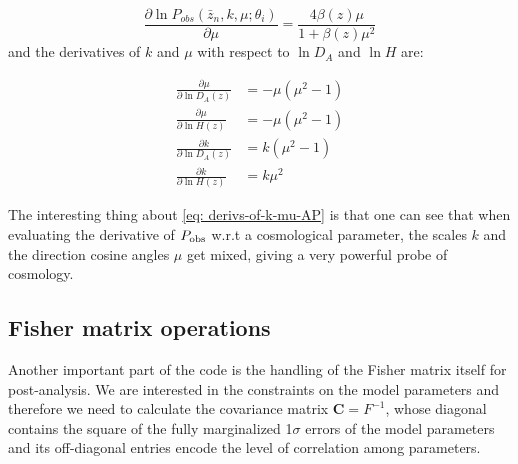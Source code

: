 \begin{equation}
\frac{\partial\ln P_{obs}\left(\bar{z}_n,k,\mu;\theta_{i}\right)}{\partial\mu}=\frac{4\beta(z)\mu}{1+\beta(z)\mu^{2}}
\end{equation}
and the derivatives of $k$ and $\mu$ with respect to $\ln D_{A}$
and $\ln H$ are:

\begin{subequations}
	
	\begin{align}
	\frac{\partial\mu}{\partial\ln D_{A}(z)} & =-\mu(\mu^{2}-1)\\
	\frac{\partial\mu}{\partial\ln H(z)} & =-\mu(\mu^{2}-1)\\
	\frac{\partial k}{\partial\ln D_{A}(z)} & =k(\mu^{2}-1)\\
	\frac{\partial k}{\partial\ln H(z)} & =k\mu^{2}
	\end{align}
	
	
	\label{eq: derivs-of-k-mu-AP}\end{subequations}

The interesting thing about \cref{eq: derivs-of-k-mu-AP} is that
one can see that when evaluating the derivative of $P_{\rm obs}$ w.r.t
a cosmological parameter, the scales $k$ and the direction cosine
angles $\mu$ get mixed, giving a very powerful probe of cosmology.


\subsection{Fisher matrix operations}

Another important part of the code is the handling of the Fisher matrix itself for post-analysis.
We are interested in the constraints on the model parameters and therefore we need to calculate
the covariance matrix $\mathbf{C} = F^{-1}$, whose diagonal contains the square of the fully marginalized 1$\sigma$
errors of the model parameters and its off-diagonal entries encode the level of correlation among parameters.

